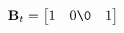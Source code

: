 \documentclass[preview]{standalone}
\begin{document}
\begin{align*}
\mathbf{B}_t = \begin{bmatrix} 1 & 0 \0 & 1\end{bmatrix}
\end{align*}
\end{document}
